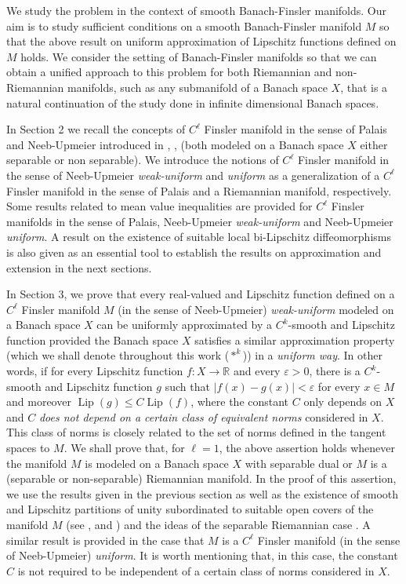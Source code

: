 \documentclass[11pt]{amsart}
\numberwithin{equation}{section}
\begin{document}
 We study the problem in the context of smooth Banach-Finsler manifolds. Our aim is to study sufficient conditions on a smooth
 Banach-Finsler manifold $M$  so that  the above result on uniform approximation of  Lipschitz functions defined on $M$ holds. We consider the setting of Banach-Finsler manifolds so that we can obtain a unified approach to this problem for both
 Riemannian and non-Riemannian manifolds, such as any submanifold of a Banach space $X$, that is a natural continuation of the study done in infinite dimensional Banach spaces.

  In Section 2 we recall  the concepts of $C^\ell$  Finsler manifold in the sense of Palais and Neeb-Upmeier introduced in  \cite{Palais}, \cite{Neeb}, \cite{Upmeier}  (both modeled on a Banach space $X$ either separable or non separable).  We introduce  the notions of
  $C^\ell$  Finsler manifold in the sense of Neeb-Upmeier {\em weak-uniform} and {\em uniform}  as a generalization of  a $C^\ell$  Finsler manifold in the sense of Palais and a Riemannian manifold, respectively.
Some results related to mean value inequalities are provided for  $C^\ell$  Finsler manifolds  in the sense of  Palais,  Neeb-Upmeier   {\em weak-uniform} and Neeb-Upmeier {\em uniform}.
 A result on the existence of suitable local bi-Lipschitz diffeomorphisms is also given as an essential tool to establish the results on approximation and extension in the next sections.

 In Section 3, we prove  that every real-valued and Lipschitz function  defined on a $C^\ell$ Finsler manifold $M$ (in the sense of
  Neeb-Upmeier) {\em weak-uniform} modeled on a Banach space $X$ can be uniformly approximated by a $C^k$-smooth and Lipschitz function provided the Banach space $X$ satisfies a similar approximation property (which we shall denote throughout this work ($*^k$)) in a {\em uniform way}. In other words,  if for every Lipschitz function $f: X\rightarrow \mathbb R$ and every $\varepsilon>0$, there is a  $C^k$-smooth and Lipschitz function $g$ such that  $|f(x)-g(x)|<\varepsilon$ for every $x\in M$ and moreover ${\operatorname{Lip}}(g)\le C {\operatorname{Lip}}(f)$, where  the constant $C$ only depends on $X$ and  $C$ {\em does not depend on a certain class of  equivalent norms} considered in $X$. This class of norms
is closely related to the set of  norms defined in the tangent spaces to $M$. We shall prove that, for $\ell=1$, the above assertion holds whenever the manifold $M$ is modeled on a Banach space $X$ with separable dual or  $M$ is a (separable or non-separable) Riemannian manifold.
In the proof of this assertion, we use the results given in the previous section as well as the existence of  smooth and Lipschitz partitions of unity subordinated to suitable open covers of  the manifold $M$ (see \cite{Rudin}, \cite{HajekJohanis} and \cite{MarLuis}) and the ideas of the separable Riemannian case \cite{AzFeMeRa}. A similar result is provided in the case that $M$
is a $C^\ell$ Finsler manifold
(in the sense of Neeb-Upmeier) {\em uniform}. It is worth mentioning  that, in this case, the constant $C$ is not required to be independent of a certain class of norms  considered in $X$.
\end{document}
